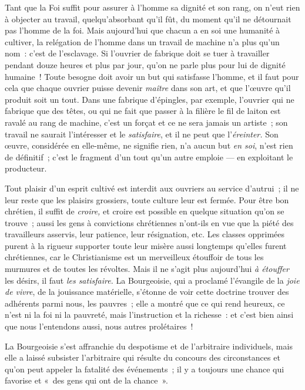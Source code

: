 \documentclass[french,twoside]{book} %
\begin{document}
\noindent Tant que la Foi suffit pour assurer à l’homme sa dignité et son rang, on n’eut rien à objecter au travail,  quelqu’absorbant qu’il fût, du moment qu’il ne détournait pas l’homme de la foi. Mais aujourd’hui que chacun a en soi une humanité à cultiver, la relégation de l’homme dans un travail de machine n’a plus qu’un nom : c’est de l’esclavage. Si l’ouvrier de fabrique doit se tuer à travailler pendant douze heures et plus par jour, qu’on ne parle plus pour lui de dignité humaine ! Toute besogne doit avoir un but qui satisfasse l’homme, et il faut pour cela que chaque ouvrier puisse devenir \emph{maître} dans son art, et que l’œuvre qu’il produit soit un tout. Dans une fabrique d’épingles, par exemple, l’ouvrier qui ne fabrique que des têtes, ou qui ne fait que passer à la filière le fil de laiton est ravalé au rang de machine, c’est un forçat et ce ne sera jamais un artiste ; son travail ne saurait l’intéresser et le \emph{satisfaire}, et il ne peut que l’\emph{éreinter.} Son œuvre, considérée en elle-même, ne signifie rien, n’a aucun but \emph{en soi}, n’est rien de définitif ; c’est le fragment d’un tout qu’un autre emploie — en exploitant le producteur.\par
Tout plaisir d’un esprit cultivé est interdit aux ouvriers au service d’autrui ; il ne leur reste que les plaisirs grossiers, toute culture leur est fermée. Pour être bon chrétien, il suffit de \emph{croire,} et croire est possible en quelque situation qu’on se trouve ; aussi les gens à convictions chrétiennes n’ont-ils en vue que la piété des travailleurs asservis, leur patience, leur résignation, etc. Les classes opprimées purent à la rigueur supporter toute leur misère aussi longtemps qu’elles furent chrétiennes, car le Christianisme est un merveilleux étouffoir de tous les murmures et de toutes les révoltes. Mais il ne s’agit plus aujourd’hui \emph{à étouffer} les désirs, il faut \emph{les satisfaire.} La Bourgeoisie, qui a proclamé l’évangile de la \emph{joie de vivre}, de la jouissance matérielle, s’étonne de voir cette doctrine trouver des adhérents parmi nous, les pauvres ; elle a montré que ce qui rend heureux, ce n’est ni la foi ni la pauvreté, mais l’instruction et la richesse : et c’est  bien ainsi que nous l’entendons aussi, nous autres prolétaires !\par
La Bourgeoisie s’est affranchie du despotisme et de l’arbitraire individuels, mais elle a laissé subsister l’arbitraire qui résulte du concours des circonstances et qu’on peut appeler la fatalité des événements ; il y a toujours une chance qui favorise et « des gens qui ont de la chance ».\par
\end{document}
